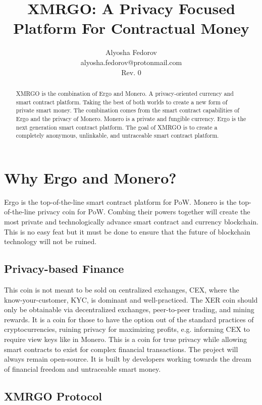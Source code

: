 \documentclass{article}
\title{XMRGO: A Privacy Focused Platform For Contractual Money}
\author{
    Alyosha Fedorov\\
    alyosha.fedorov@protonmail.com\\
    Rev. 0
}
\date{}
\begin{document}
 

\maketitle 

\begin{abstract}
    XMRGO is the combination of Ergo and Monero. A privacy-oriented currency 
    and smart contract platform. Taking the best of both worlds to create a 
    new form of private smart money. The combination comes from the smart 
    contract capabilities of Ergo and the privacy of Monero. Monero is a 
    private and fungible currency. Ergo is the next generation smart 
    contract platform. The goal of XMRGO is to create a completely 
    anonymous, unlinkable, and untraceable smart contract platform.
\end{abstract}

\section*{Why Ergo and Monero?}

\indent Ergo is the top-of-the-line smart contract platform for PoW. Monero 
is the top-of-the-line privacy coin for PoW. Combing their powers together 
will create the most private and technologically advance smart contract and 
currency blockchain. This is no easy feat but it must be done to ensure that 
the future of blockchain technology will not be ruined.

\subsection*{Privacy-based Finance}

\indent This coin is not meant to be sold on centralized exchanges, CEX, where 
the know-your-customer, KYC, is dominant and well-practiced. The XER coin 
should only be obtainable via decentralized exchanges, peer-to-peer trading, 
and mining rewards. It is a coin for those to have the option out of the 
standard practices of cryptocurrencies, ruining privacy for maximizing 
profits, e.g. informing CEX to require view keys like in Monero. This is a 
coin for true privacy while allowing smart contracts to exist for complex 
financial transactions. The project will always remain open-source. It is built 
by developers working towards the dream of financial freedom and untraceable 
smart money.


\subsection*{XMRGO Protocol}
\end{document}
